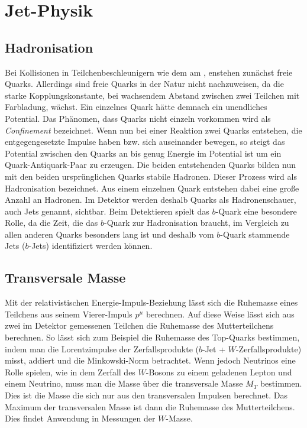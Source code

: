 \section{Jet-Physik}
\subsection{Hadronisation}
Bei Kollisionen in Teilchenbeschleunigern wie dem \lhc am \cern, enstehen zunächst freie Quarks. Allerdings sind freie Quarks in der Natur nicht nachzuweisen, da die starke Kopplungskonstante, bei wachsendem Abstand zwischen zwei Teilchen mit Farbladung, wächst. Ein einzelnes Quark hätte demnach ein unendliches Potential. Das Phänomen, dass Quarks nicht einzeln vorkommen wird als \emph{Confinement} bezeichnet. Wenn nun bei einer Reaktion zwei Quarks entstehen, die entgegengesetzte Impulse haben bzw. sich auseinander bewegen, so steigt das Potential zwischen den Quarks an bis genug Energie im Potential ist um ein Quark-Antiquark-Paar zu erzeugen. Die beiden entstehenden Quarks bilden nun mit den beiden ursprünglichen Quarks stabile Hadronen. Dieser Prozess wird als Hadronisation bezeichnet. Aus einem einzelnen Quark entstehen dabei eine große Anzahl an Hadronen. Im Detektor werden deshalb Quarks als Hadronenschauer, auch Jets genannt, sichtbar. Beim Detektieren spielt das $b$-Quark eine besondere Rolle, da die Zeit, die das $b$-Quark zur Hadronisation braucht, im Vergleich zu allen anderen Quarks besonders lang ist und deshalb vom $b$-Quark stammende Jets ($b$-Jets) identifiziert werden können.
\subsection{Transversale Masse}
Mit der relativistischen Energie-Impuls-Beziehung lässt sich die Ruhemasse eines Teilchens aus seinem Vierer-Impuls $p^\mu$ berechnen. Auf diese Weise lässt sich aus zwei im Detektor gemessenen Teilchen die Ruhemasse des Mutterteilchens berechnen. So lässt sich zum Beispiel die Ruhemasse des Top-Quarks bestimmen, indem man die Lorentzimpulse der Zerfallsprodukte ($b$-Jet + $W$-Zerfallsprodukte) misst, addiert und die Minkowski-Norm betrachtet. Wenn jedoch Neutrinos eine Rolle spielen, wie in dem Zerfall des $W$-Bosons zu einem geladenen Lepton und einem Neutrino, muss man die Masse über die transversale Masse $M_T$ bestimmen. Dies ist die Masse die sich nur aus den transversalen Impulsen berechnet. Das Maximum der transversalen Masse ist dann die Ruhemasse des Mutterteilchens. Dies findet Anwendung in Messungen der $W$-Masse.

